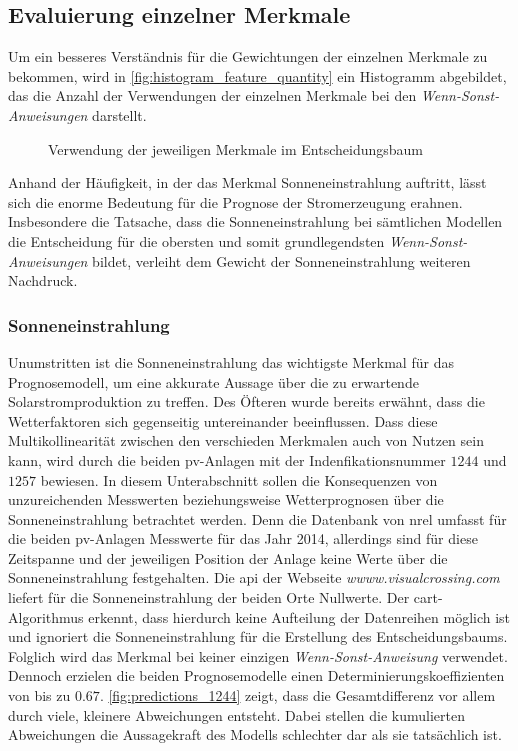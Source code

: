 \documentclass[12pt, a4paper]{article}
\begin{document}
\subsection{Evaluierung einzelner Merkmale}

Um ein besseres Verständnis für die Gewichtungen der einzelnen Merkmale zu bekommen, wird in \autoref{fig:histogram_feature_quantity} ein Histogramm abgebildet, das die Anzahl der Verwendungen der einzelnen Merkmale bei den \textit{Wenn-Sonst-Anweisungen} darstellt.

\begin{figure}[H]
\centering
\fontsize{20}{20}\selectfont
\def\svgwidth{400pt}

\caption{Verwendung der jeweiligen Merkmale im Entscheidungsbaum}
\label{fig:histogram_feature_quantity}
\end{figure}

Anhand der Häufigkeit, in der das Merkmal Sonneneinstrahlung auftritt, lässt sich die enorme Bedeutung für die Prognose der Stromerzeugung erahnen. Insbesondere die Tatsache, dass die Sonneneinstrahlung bei sämtlichen Modellen die Entscheidung für die obersten und somit grundlegendsten \textit{Wenn-Sonst-Anweisungen} bildet, verleiht dem Gewicht der Sonneneinstrahlung weiteren Nachdruck.

\subsubsection{Sonneneinstrahlung}

Unumstritten ist die Sonneneinstrahlung das wichtigste Merkmal für das Prognosemodell, um eine akkurate Aussage über die zu erwartende Solarstromproduktion zu treffen. Des Öfteren wurde bereits erwähnt, dass die Wetterfaktoren sich gegenseitig untereinander beeinflussen. Dass diese Multikollinearität zwischen den verschieden Merkmalen auch von Nutzen sein kann, wird durch die beiden \ac{pv}-Anlagen mit der Indenfikationsnummer $1244$ und $1257$ bewiesen. In diesem Unterabschnitt sollen die Konsequenzen von unzureichenden Messwerten beziehungsweise Wetterprognosen über die Sonneneinstrahlung betrachtet werden. Denn die Datenbank von \ac{nrel} umfasst für die beiden \ac{pv}-Anlagen Messwerte für das Jahr 2014, allerdings sind für diese Zeitspanne und der jeweiligen Position der Anlage keine Werte über die Sonneneinstrahlung festgehalten. Die \ac{api} der Webseite \textit{wwww.visualcrossing.com} liefert für die Sonneneinstrahlung der beiden Orte Nullwerte. Der \ac{cart}-Algorithmus erkennt, dass hierdurch keine Aufteilung der Datenreihen möglich ist und ignoriert die Sonneneinstrahlung für die Erstellung des Entscheidungsbaums. Folglich wird das Merkmal bei keiner einzigen \textit{Wenn-Sonst-Anweisung} verwendet. Dennoch erzielen die beiden Prognosemodelle einen Determinierungskoeffizienten von bis zu $0.67$. \autoref{fig:predictions_1244} zeigt, dass die Gesamtdifferenz vor allem durch viele, kleinere Abweichungen entsteht. Dabei stellen die kumulierten Abweichungen die Aussagekraft des Modells schlechter dar als sie tatsächlich ist. 
\end{document}
